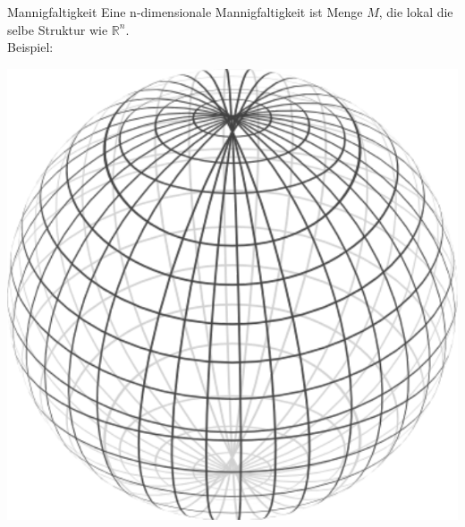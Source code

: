 \documentclass[mathserif]{beamer}
\theoremstyle{definition}
\begin{document}
	\begin{frame}{Mannigfaltigkeit}
		Eine n-dimensionale Mannigfaltigkeit ist Menge $M$, die lokal die selbe Struktur wie $\mathbb{R}^n$.\\
		
			Beispiel:
			
		\pause
		\begin{minipage}{0.45\linewidth}
			
			\centering
			\includegraphics[scale=0.3]{sphere.pdf}
		\end{minipage}
		\hfill
		\pause
		\begin{minipage}{0.45\linewidth}
			

\end{minipage}
\end{frame}
\end{document}
